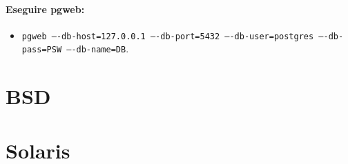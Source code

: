 \paragraph{Eseguire pgweb:}

\begin{itemize}
  \item \texttt{pgweb ----db-host=127.0.0.1 ----db-port=5432 ----db-user=postgres ----db-pass=PSW ----db-name=DB}.
\end{itemize}


\section{BSD}

\section{Solaris}

